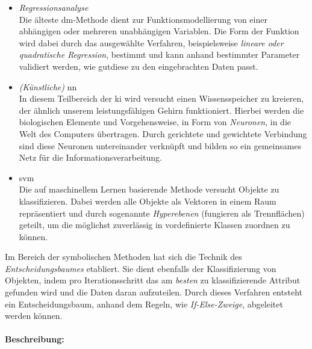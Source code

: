 \begin{itemize}
\item \textit{Regressionsanalyse}
\\ Die älteste \gls{dm}-Methode dient zur Funktionsmodellierung von einer abhängigen oder mehreren unabhängigen Variablen. Die Form der Funktion wird dabei durch das ausgewählte Verfahren, beispielsweise \textit{lineare oder quadratische Regression}, bestimmt und kann anhand bestimmter Parameter validiert werden, wie \glqq gut\grqq diese zu den eingebrachten Daten passt.

\item \textit{(Künstliche)} \gls{nn}
\\ In diesem Teilbereich der \gls{ki} wird versucht einen Wissensspeicher zu kreieren, der ähnlich unserem leistungsfähigen Gehirn funktioniert. Hierbei werden die biologischen Elemente und Vorgehensweise, in Form von \textit{Neuronen}, in die Welt des Computers übertragen. Durch gerichtete und gewichtete Verbindung sind diese Neuronen untereinander verknüpft und bilden so ein gemeinsames Netz für die Informationsverarbeitung.

\item \gls{svm}
\\ Die auf maschinellem Lernen basierende Methode versucht Objekte zu klassifizieren. Dabei werden alle Objekte als Vektoren in einem Raum repräsentiert und durch sogenannte \textit{Hyperebenen} (fungieren als Trennflächen) geteilt, um die möglichst zuverlässig in vordefinierte Klassen zuordnen zu können.
\end{itemize}

Im Bereich der symbolischen Methoden hat sich die Technik des \textit{Entscheidungsbaumes} etabliert. Sie dient ebenfalls der Klassifizierung von Objekten, indem pro Iterationsschritt das am \textit{besten} zu klassifizierende Attribut gefunden wird und die Daten daran aufzuteilen. Durch dieses Verfahren entsteht ein Entscheidungsbaum, anhand dem Regeln, wie \textit{If-Else-Zweige}, abgeleitet werden können.

\paragraph{Beschreibung:}

